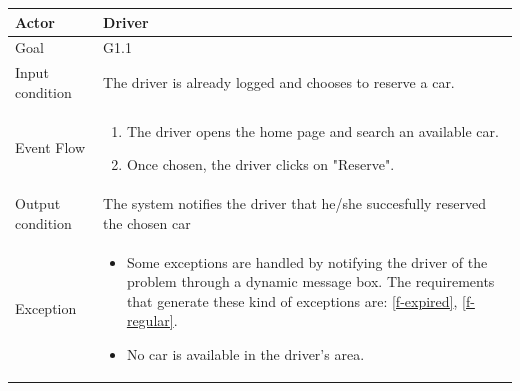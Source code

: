 
\begin{table}[H]
	\begin{center}
		\begin{tabular}{| l | p{} |}
			\hline
			Actor & Driver \\
			\hline
			Goal & G1.1
			\\
			\hline
			Input condition & The driver is already logged and chooses to reserve a car.  \\
			\hline
			Event Flow & \begin{enumerate}
				\item The driver opens the home page and search an available car.
				\item Once chosen, the driver clicks on "Reserve".
			\end{enumerate}
			\\
			\hline
			Output condition & The system notifies the driver that he/she succesfully reserved the chosen car \\
			\hline
			
			Exception &  \begin{itemize}
				\item Some exceptions are handled by notifying the driver of the problem through a dynamic message box.				
				The requirements that generate these kind of exceptions are:
				\ref{f-expired},    %
				\ref{f-regular}.    %
				\item No car is available in the driver's area.
				\end{itemize}
			\\
			\hline
		\end{tabular}
	\end{center}
\end{table}

